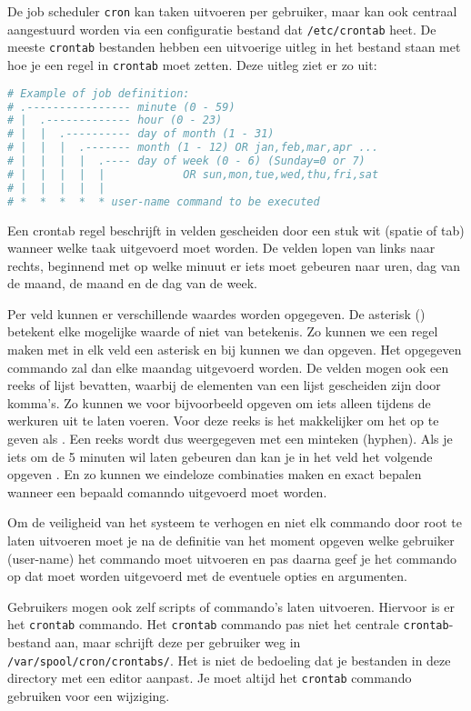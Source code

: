 De job scheduler \texttt{cron} kan taken uitvoeren per gebruiker, maar kan ook centraal aangestuurd worden via een configuratie bestand dat \texttt{/etc/crontab} heet. De meeste \texttt{crontab} bestanden hebben een uitvoerige uitleg in het bestand staan met hoe je een regel in \texttt{crontab} moet zetten. Deze uitleg ziet er zo uit:

\begin{lstlisting}[language=bash]
# Example of job definition:
# .---------------- minute (0 - 59)
# |  .------------- hour (0 - 23)
# |  |  .---------- day of month (1 - 31)
# |  |  |  .------- month (1 - 12) OR jan,feb,mar,apr ...
# |  |  |  |  .---- day of week (0 - 6) (Sunday=0 or 7)
# |  |  |  |  |            OR sun,mon,tue,wed,thu,fri,sat
# |  |  |  |  |
# *  *  *  *  * user-name command to be executed
\end{lstlisting}

Een crontab regel beschrijft in velden gescheiden door een stuk wit (spatie of tab) wanneer welke taak uitgevoerd moet worden. De velden lopen van links naar rechts, beginnend met op welke minuut er iets moet gebeuren naar uren, dag van de maand, de maand en de dag van de week.

Per veld kunnen er verschillende waardes worden opgegeven. De asterisk (\*) betekent elke mogelijke waarde of niet van betekenis. Zo kunnen we een regel maken met in elk veld een asterisk en bij  kunnen we dan  opgeven. Het opgegeven commando zal dan elke maandag uitgevoerd worden. De velden mogen ook een reeks of lijst bevatten, waarbij de elementen van een lijst gescheiden zijn door komma's. Zo kunnen we voor  bijvoorbeeld opgeven  om iets alleen tijdens de werkuren uit te laten voeren. Voor deze reeks is het makkelijker om het op te geven als . Een reeks wordt dus weergegeven met een minteken (hyphen). Als je iets om de 5 minuten wil laten gebeuren dan kan je in het  veld het volgende opgeven . En zo kunnen we eindeloze combinaties maken en exact bepalen wanneer een bepaald comanndo uitgevoerd moet worden.

Om de veiligheid van het systeem te verhogen en niet elk commando door root te laten uitvoeren moet je na de definitie van het moment opgeven welke gebruiker (user-name) het commando moet uitvoeren en pas daarna geef je het commando op dat moet worden uitgevoerd met de eventuele opties en argumenten.

Gebruikers mogen ook zelf scripts of commando's laten uitvoeren. Hiervoor is er het \texttt{crontab} commando. Het \texttt{crontab} commando pas niet het centrale \texttt{crontab}-bestand aan, maar schrijft deze per gebruiker weg in \texttt{/var/spool/cron/crontabs/}. Het is niet de bedoeling dat je bestanden in deze directory met een editor aanpast. Je moet altijd het \texttt{crontab} commando gebruiken voor een wijziging.

